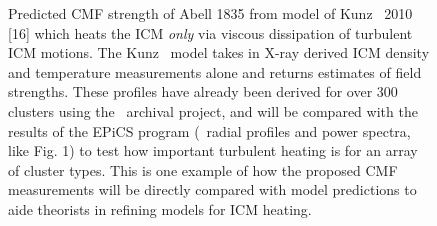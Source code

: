 \begin{figure}
\begin{center}
\begin{minipage}{0.495\linewidth}
    \end{minipage}
    \begin{minipage}{0.495\linewidth}
      \caption{Predicted CMF strength of Abell 1835 from model of Kunz
        \etal\ 2010 [16] which heats the ICM {\it{only}} via viscous
        dissipation of turbulent ICM motions. The Kunz \etal\ model
        takes in X-ray derived ICM density and temperature
        measurements alone and returns estimates of field
        strengths. These profiles have already been derived for over
        300 clusters using the \chandra\ archival project, and will be
        compared with the results of the EPiCS program (\eg\ radial
        profiles and power spectra, like Fig. 1) to test how important
        turbulent heating is for an array of cluster types. This is
        one example of how the proposed CMF measurements will be
        directly compared with model predictions to aide theorists in
        refining models for ICM heating.}
    \end{minipage}
  \end{center}
\end{figure}
